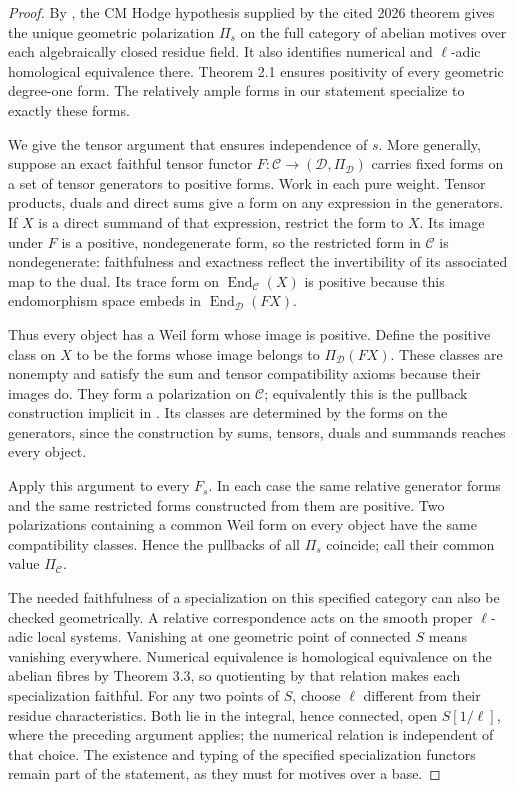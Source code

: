 \begin{proof}
By \citet[Theorem 3.3 and Corollary 3.4,
pp.~607--608]{D_Milne2002}, the CM Hodge hypothesis
supplied by the cited 2026 theorem gives the unique
geometric polarization $\Pi_s$ on the full category
of abelian motives over each algebraically closed
residue field. It also identifies numerical and
$\ell$-adic homological equivalence there. Theorem 2.1
ensures positivity of every geometric degree-one form.
The relatively ample forms in our statement specialize
to exactly these forms.

We give the tensor argument that ensures independence
of $s$. More generally, suppose an exact faithful tensor
functor $F:\mathcal C\to(\mathcal D,\Pi_{\mathcal D})$
carries fixed forms on a set of tensor generators to
positive forms. Work in each pure weight.
Tensor products, duals and direct sums
give a form on any expression in the generators.
If $X$ is a direct summand of that expression, restrict
the form to $X$. Its image under $F$ is a positive,
nondegenerate form, so the restricted form in
$\mathcal C$ is nondegenerate: faithfulness and
exactness reflect the invertibility of its associated
map to the dual. Its trace form on
$\operatorname{End}_{\mathcal C}(X)$ is positive
because this endomorphism space embeds in
$\operatorname{End}_{\mathcal D}(F X)$.

Thus every object has a Weil form whose image is
positive. Define the positive class on $X$ to be the
forms whose image belongs to $\Pi_{\mathcal D}(F X)$.
These classes are nonempty and satisfy the sum and
tensor compatibility axioms because their images do.
They form a polarization on $\mathcal C$; equivalently
this is the pullback construction implicit in
\citet[Lemma 1.2 and its preceding definition,
pp.~602--603]{D_Milne2002}.
Its classes are determined by the forms on the
generators, since the construction by sums, tensors,
duals and summands reaches every object.

Apply this argument to every $F_s$. In each case the
same relative generator forms and the same restricted
forms constructed from them are positive. Two
polarizations containing a common Weil form on every
object have the same compatibility classes. Hence the
pullbacks of all $\Pi_s$ coincide; call their common
value $\Pi_{\mathcal C}$.

The needed faithfulness of a specialization on this
specified category can also be checked geometrically.
A relative correspondence acts on the smooth proper
$\ell$-adic local systems. Vanishing at one geometric
point of connected $S$ means vanishing everywhere.
Numerical equivalence is homological equivalence on
the abelian fibres by Theorem 3.3, so quotienting by
that relation makes each specialization faithful.
For any two points of $S$, choose $\ell$ different
from their residue characteristics. Both lie in
the integral, hence connected, open $S[1/\ell]$,
where the preceding argument applies; the numerical
relation is independent of that choice.
The existence and typing
of the specified specialization functors remain part
of the statement, as they must for motives over a
base.


\end{proof}
